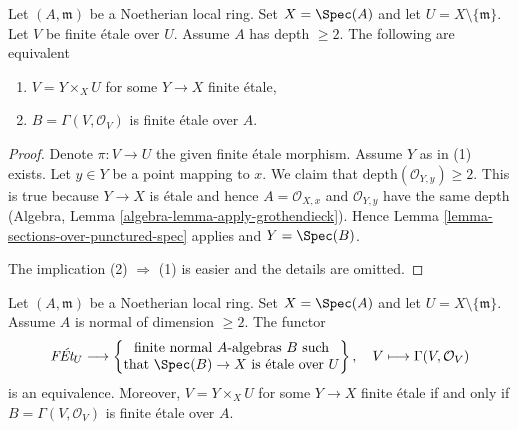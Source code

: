 \begin{lemma}
\label{lemma-reformulate-purity}
Let $(A, \mathfrak m)$ be a Noetherian local ring. Set $X = \Spec(A)$
and let $U = X \setminus \{\mathfrak m\}$.
Let $V$ be finite \'etale
over $U$. Assume $A$ has depth $\geq 2$. The following are equivalent
\begin{enumerate}
\item $V = Y \times_X U$ for some $Y \to X$ finite \'etale,
\item $B = \Gamma(V, \mathcal{O}_V)$ is finite \'etale over $A$.
\end{enumerate}
\end{lemma}

\begin{proof}
Denote $\pi : V \to U$ the given finite \'etale morphism.
Assume $Y$ as in (1) exists.
Let $y \in Y$ be a point mapping to $x$. We claim that
$\text{depth}(\mathcal{O}_{Y, y}) \geq 2$.
This is true because $Y \to X$ is \'etale and hence
$A = \mathcal{O}_{X, x}$ and $\mathcal{O}_{Y, y}$ have
the same depth (Algebra, Lemma \ref{algebra-lemma-apply-grothendieck}).
Hence Lemma \ref{lemma-sections-over-punctured-spec}
applies and $Y = \Spec(B)$.

\medskip\noindent
The implication (2) $\Rightarrow$ (1) is easier and the
details are omitted.
\end{proof}

\begin{lemma}
\label{lemma-reformulate-purity-normal}
Let $(A, \mathfrak m)$ be a Noetherian local ring. Set $X = \Spec(A)$
and let $U = X \setminus \{\mathfrak m\}$. Assume $A$ is normal
of dimension $\geq 2$. The functor
$$
\textit{F\'Et}_U \longrightarrow
\left\{
\begin{matrix}
\text{finite normal }A\text{-algebras }B\text{ such} \\
\text{that }\Spec(B) \to X\text{ is \'etale over }U
\end{matrix}
\right\},
\quad
V \longmapsto \Gamma(V, \mathcal{O}_V)
$$
is an equivalence. Moreover, $V = Y \times_X U$ for some $Y \to X$
finite \'etale if and only if $B = \Gamma(V, \mathcal{O}_V)$
is finite \'etale over $A$.
\end{lemma}

